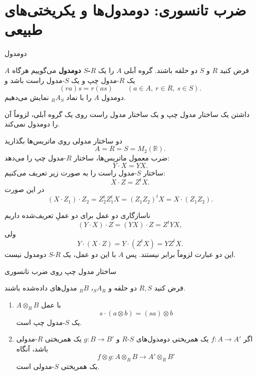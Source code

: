 \section{ضرب تانسوری: دومدول‌ها و یکریختی‌های طبیعی}

\begin{frame}[t]{دومدول}
\label{lec20:bimodule}
\begin{definition}
فرض کنید \(R\) و \(S\) دو حلقه باشند. گروه آبلی \(A\) را یک
\textbf{\(R\)-\(S\) دومدول}  می‌گوییم هرگاه \(A\) یک
\(R\)-مدول چپ و یک \(S\)-مدول راست باشد و
\[
    (ra)s=r(as)\qquad(a\in A,\ r\in R,\ s\in S).
\]
دومدول \(A\) را با نماد \({}_R A_S\) نمایش می‌دهیم.
\end{definition}
\begin{remark}
داشتن یک ساختار مدول چپ و یک ساختار مدول راست روی یک گروه آبلی، لزوماً آن را دومدول نمی‌کند.
\end{remark}
\end{frame}

\begin{frame}[t]{دو ساختار مدولی روی ماتریس‌ها}
\label{lec20:matrix-actions}
بگذارید
\[
    A=R=S=M_2(\mathbb R).
\]
ضرب معمول ماتریس‌ها، ساختار \(R\)-مدول چپ را می‌دهد:
\[
    Y\cdot X=YX.
\]
ساختار \(S\)-مدول راست را به صورت زیر تعریف می‌کنیم:
\[
    X\cdot Z=Z^tX.
\]
در این صورت
\[
    (X\cdot Z_1)\cdot Z_2
    =Z_2^tZ_1^tX=(Z_1Z_2)^tX=X\cdot(Z_1Z_2).
\]
\end{frame}

\begin{frame}[t]{ناسازگاری دو عمل}
\label{lec20:matrix-incompatibility}
برای دو عملِ تعریف‌شده داریم
\[
    (Y\cdot X)\cdot Z=(YX)\cdot Z=Z^tYX,
\]
ولی
\[
    Y\cdot(X\cdot Z)=Y\cdot(Z^tX)=YZ^tX.
\]
این دو عبارت لزوماً برابر نیستند. پس \(A\) با این دو عمل، یک \(R\)-\(S\) دومدول نیست.
\end{frame}

\begin{frame}[t]{ساختار مدول چپ روی ضرب تانسوری}
\label{lec20:left-tensor-action}
\begin{theorem}
فرض کنید \(R,S\) دو حلقه و \({}_S A_R\)، \({}_R B\) مدول‌های داده‌شده باشند.
\begin{enumerate}
\item \(A\otimes_R B\) با عمل
\[
    s\cdot(a\otimes b)=(sa)\otimes b
\]
یک \(S\)-مدول چپ است.
\item اگر \(f:A\to A'\) یک همریختی دومدول‌های \(S\)-\(R\) و
\(g:B\to B'\) یک همریختی \(R\)-مدولی باشد، آنگاه
\[
    f\otimes g:A\otimes_R B\longrightarrow A'\otimes_R B'
\]
یک همریختی \(S\)-مدولی است.
\end{enumerate}
\end{theorem}
\end{frame}

